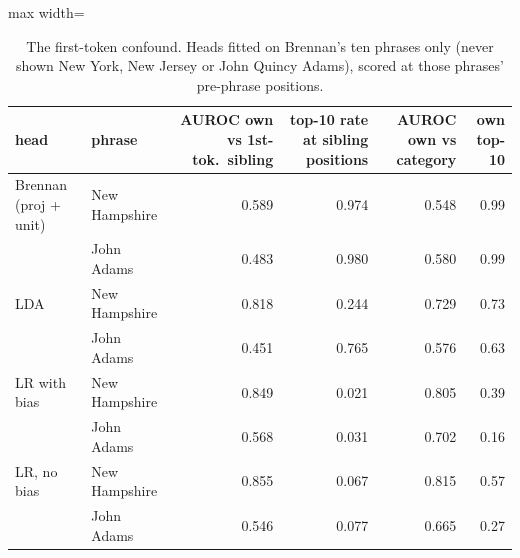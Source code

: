 \begin{table}[t]
\centering
\footnotesize
\caption{The first-token confound. Heads fitted on Brennan's ten phrases only (never shown New York, New Jersey or John Quincy Adams), scored at those phrases' pre-phrase positions.}
\label{tab:bench_sibling}
\begin{adjustbox}{max width=\textwidth}
\begin{tabular}{llrrrr}
\toprule
head & phrase & AUROC own vs 1st-tok.\ sibling & top-10 rate at sibling positions & AUROC own vs category & own top-10 \\
\midrule
Brennan (proj + unit) & New Hampshire & 0.589 & 0.974 & 0.548 & 0.99 \\
 & John Adams & 0.483 & 0.980 & 0.580 & 0.99 \\
LDA & New Hampshire & 0.818 & 0.244 & 0.729 & 0.73 \\
 & John Adams & 0.451 & 0.765 & 0.576 & 0.63 \\
LR with bias & New Hampshire & 0.849 & 0.021 & 0.805 & 0.39 \\
 & John Adams & 0.568 & 0.031 & 0.702 & 0.16 \\
LR, no bias & New Hampshire & 0.855 & 0.067 & 0.815 & 0.57 \\
 & John Adams & 0.546 & 0.077 & 0.665 & 0.27 \\
\bottomrule
\end{tabular}
\end{adjustbox}
\end{table}